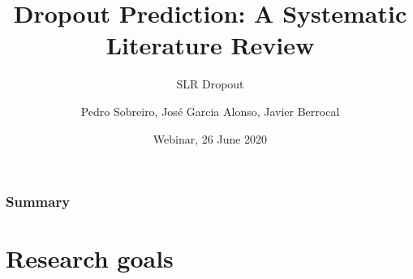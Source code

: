 \documentclass[10pt]{beamer}
\title[Dropout Prediction]{Dropout Prediction: A Systematic Literature Review}
\subtitle{SLR Dropout}
\author{Pedro Sobreiro, José Garcia Alonso, Javier Berrocal} %
\institute[UNEX] %
{ 
University of Extremadura ~~~~~~~~~~~~~~~%
\medskip
\textit{pesobreiro@gmail.com} %
}
\date{Webinar, 26 June 2020} %
\begin{document}
\begin{frame}
	\titlepage %
\end{frame}

\begin{frame}
\frametitle{Summary} %
\tableofcontents %

\end{frame}


\section{Research goals} %
\begin{comment}
Dropout predicting is challenging analysis process which requires appropriate approaches to address the dropout. Existing approaches are applied in different areas such as education, telecommunications, retail, social networks, and banking services. The goal is to identify customers in the risk of dropout to support retention strategies. This research developed a systematic literature review to evaluate the development of existing studies to predict dropout using machine learning,  following the guidelines recommended by Kitchenham and Peterson. The systematic review followed three phases planning, conducting and reporting. The selection of the most relevant articles was based on the use of Active Systematic Review tool using artificial intelligence algorithms. The criteria identified 28 articles and several research lines where identified. Dropout is a transversal problem for several sectors of economic activity, where it can be taken countermeasures before it happens if detected early.
\end{comment}
\end{document}
